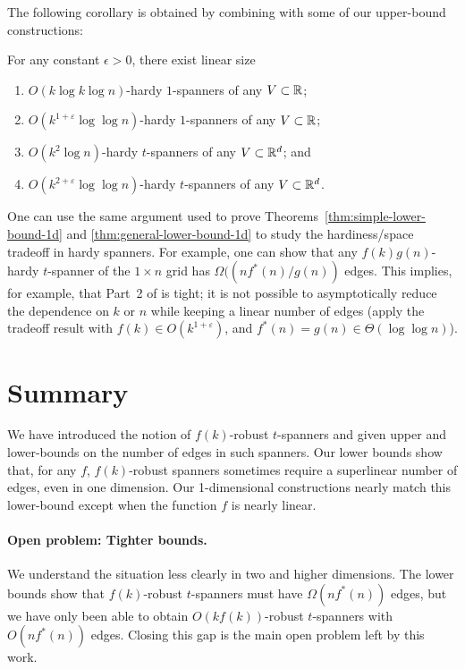 \documentclass{patmorin}
\newcommand{\eps}{\varepsilon}
\begin{document}
The following corollary is obtained by combining 
with some of our upper-bound constructions:
\begin{cor}
  For any constant $\epsilon >0$, there exist linear size
  \begin{enumerate}
    \item $O(k\log k\log n)$-hardy $1$-spanners of any
      $V\subset \mathbb{R}$;
    \item $O(k^{1+\eps}\log\log n)$-hardy $1$-spanners of any
      $V\subset \mathbb{R}$;
    \item $O(k^2\log n)$-hardy $t$-spanners of any
      $V\subset \mathbb{R}^d$; and
    \item $O(k^{2+\eps}\log\log n)$-hardy $t$-spanners of any
      $V\subset \mathbb{R}^d$.
  \end{enumerate}
\end{cor}


\begin{rem}
One can use the same argument used to prove
Theorems~\ref{thm:simple-lower-bound-1d} and
\ref{thm:general-lower-bound-1d} to study the hardiness/space tradeoff
in hardy spanners.  For example, one can show that any $f(k)g(n)$-hardy
$t$-spanner of the $1\times n$ grid has $\Omega((nf^*(n)/g(n))$ edges.
This implies, for example, that Part~2 of  is tight;
it is not possible to asymptotically reduce the dependence on $k$ or $n$
while keeping a linear number of edges (apply the tradeoff result with
$f(k)\in O(k^{1+\eps})$, and $f^*(n)=g(n)\in \Theta(\log\log n)$).
\end{rem}

\section{Summary}

We have introduced the notion of $f(k)$-robust $t$-spanners and given
upper and lower-bounds on the number of edges in such spanners.  Our lower
bounds show that, for any $f$, $f(k)$-robust spanners sometimes require
a superlinear number of edges, even in one dimension.  Our 1-dimensional
constructions nearly match this lower-bound except when the function
$f$ is nearly linear.

\paragraph{Open problem: Tighter bounds.}
We understand the situation less clearly in two and higher dimensions.
The lower bounds show that $f(k)$-robust $t$-spanners must have
$\Omega(nf^*(n))$ edges, but we have only been able to obtain
$O(kf(k))$-robust $t$-spanners with $O(nf^*(n))$ edges.  Closing this
gap is the main open problem left by this work.
\end{document}
